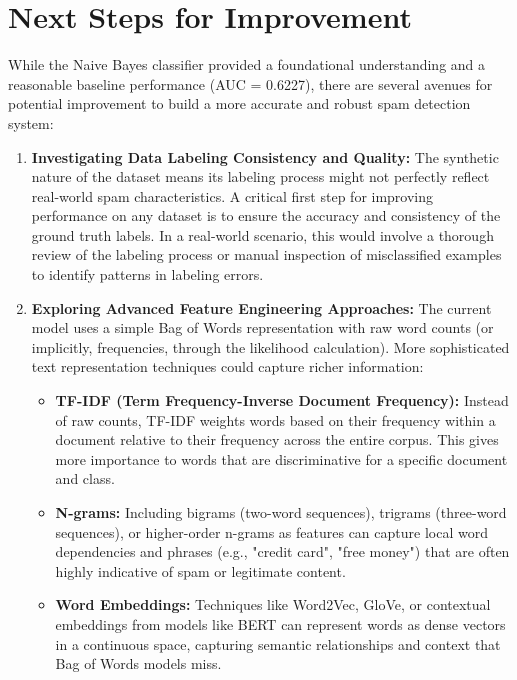 \documentclass[12pt,letterpaper]{article}
\begin{document}
\section{Next Steps for Improvement}

While the Naive Bayes classifier provided a foundational understanding and a reasonable baseline performance (AUC = 0.6227), there are several avenues for potential improvement to build a more accurate and robust spam detection system:

\begin{enumerate}
    \item \textbf{Investigating Data Labeling Consistency and Quality:} The synthetic nature of the dataset means its labeling process might not perfectly reflect real-world spam characteristics. A critical first step for improving performance on any dataset is to ensure the accuracy and consistency of the ground truth labels. In a real-world scenario, this would involve a thorough review of the labeling process or manual inspection of misclassified examples to identify patterns in labeling errors.
    
    \item \textbf{Exploring Advanced Feature Engineering Approaches:} The current model uses a simple Bag of Words representation with raw word counts (or implicitly, frequencies, through the likelihood calculation). More sophisticated text representation techniques could capture richer information:
    \begin{itemize}
        \item \textbf{TF-IDF (Term Frequency-Inverse Document Frequency):} Instead of raw counts, TF-IDF weights words based on their frequency within a document relative to their frequency across the entire corpus. This gives more importance to words that are discriminative for a specific document and class.
        
        \item \textbf{N-grams:} Including bigrams (two-word sequences), trigrams (three-word sequences), or higher-order n-grams as features can capture local word dependencies and phrases (e.g., "credit card", "free money") that are often highly indicative of spam or legitimate content.
        
        \item \textbf{Word Embeddings:} Techniques like Word2Vec, GloVe, or contextual embeddings from models like BERT can represent words as dense vectors in a continuous space, capturing semantic relationships and context that Bag of Words models miss.
        

\end{itemize}
\end{enumerate}
\end{document}
